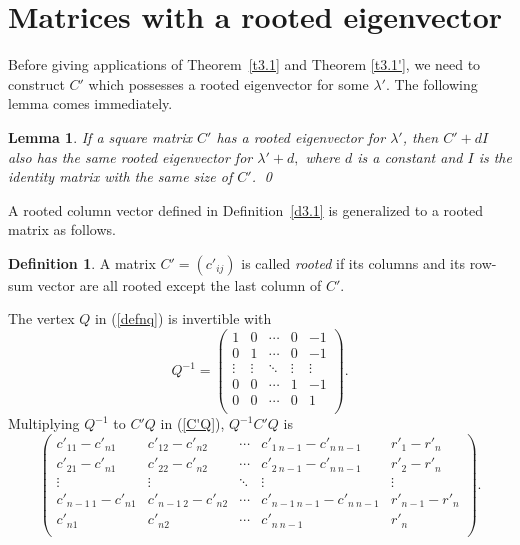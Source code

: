 \documentclass[final,3p, times, 12pt]{elsarticle}
\theoremstyle{plain}
\newtheorem{lem}[thm]{Lemma}
\theoremstyle{definition}
\newtheorem{defn}[thm]{Definition}
\theoremstyle{remark}
\numberwithin{equation}{section}
\begin{document}
\section{Matrices with a rooted eigenvector}\label{ns4}

Before giving applications of Theorem~\ref{t3.1} and Theorem \ref{t3.1'}, we need to construct $C'$ which possesses a rooted eigenvector for some $\lambda'$. The following lemma comes immediately.


\begin{lem}\label{l4.1}
If a square matrix $C'$ has a rooted eigenvector for $\lambda'$, then $C'+dI$ also has
the same rooted eigenvector for $\lambda'+d,$ where $d$ is a constant and $I$ is the identity matrix with the same size of $C'$. \qed
\end{lem}

 A rooted column vector defined in Definition~\ref{d3.1} is generalized to a rooted matrix as follows.
\begin{defn}\label{def4.1}
A  matrix $C'=(c'_{ij})$ is called {\it rooted}  if its  columns and its row-sum vector are all rooted except the last column of $C'$.
\end{defn}


The vertex $Q$ in (\ref{defnq}) is invertible with
$$Q^{-1}=\begin{pmatrix}
1 & 0 & \cdots & 0 & -1 \\
0 & 1 & \cdots & 0 & -1 \\
\vdots & \vdots & \ddots & \vdots & \vdots \\
0 & 0 & \cdots & 1 & -1 \\
0 & 0 & \cdots & 0 & 1 \\
\end{pmatrix}.$$ Multiplying $Q^{-1}$ to $C'Q$ in (\ref{C'Q}),   $Q^{-1}C'Q$ is
\begin{equation}\label{e3.1}\begin{pmatrix}
c'_{11}-c'_{n1}     & c'_{12}-c'_{n2} & \cdots     & c'_{1\ n-1}-c'_{n\ n-1} & r'_1-r'_n \\
c'_{21}-c'_{n1}     & c'_{22}-c'_{n2} & \cdots     & c'_{2\ n-1}-c'_{n\ n-1} & r'_2-r'_n \\
\vdots              & \vdots & \ddots              & \vdots & \vdots \\
c'_{n-1\ 1}-c'_{n1} & c'_{n-1\ 2}-c'_{n2} & \cdots & c'_{n-1\ n-1}-c'_{n\ n-1} & r'_{n-1}-r'_{n} \\
c'_{n1}             & c'_{n2} & \cdots             & c'_{n\ n-1} & r'_n \\
\end{pmatrix}.
\end{equation}
\end{document}
